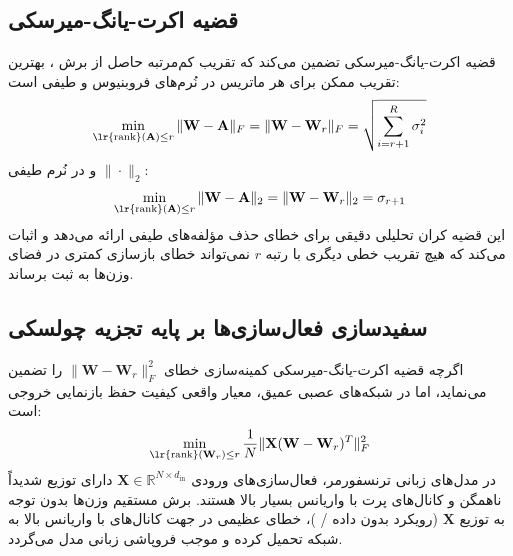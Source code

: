 \documentclass[12pt,a4paper]{report}
\theoremstyle{definition}
\begin{document}
\subsection{قضیه اکرت-یانگ-میرسکی }
قضیه اکرت-یانگ-میرسکی تضمین می‌کند که تقریب کم‌مرتبه حاصل از برش ، بهترین تقریب ممکن برای هر ماتریس در نُرم‌های فروبنیوس و طیفی است:
\begin{equation}
\min_{\text{\lr{rank}}(\mathbf{A}) \le r} \|\mathbf{W} - \mathbf{A}\|_F = \|\mathbf{W} - \mathbf{W}_r\|_F = \sqrt{\sum_{i=r+1}^R \sigma_i^2}
\end{equation}
و در نُرم طیفی $\|\cdot\|_2$:
\begin{equation}
\min_{\text{\lr{rank}}(\mathbf{A}) \le r} \|\mathbf{W} - \mathbf{A}\|_2 = \|\mathbf{W} - \mathbf{W}_r\|_2 = \sigma_{r+1}
\end{equation}
این قضیه کران تحلیلی دقیقی برای خطای حذف مؤلفه‌های طیفی ارائه می‌دهد و اثبات می‌کند که هیچ تقریب خطی دیگری با رتبه $r$ نمی‌تواند خطای بازسازی کمتری در فضای وزن‌ها به ثبت برساند.

\subsection{سفیدسازی فعال‌سازی‌ها بر پایه تجزیه چولسکی }
\label{sec:cholesky_whitening}
اگرچه قضیه اکرت-یانگ-میرسکی کمینه‌سازی خطای $\| \mathbf{W} - \mathbf{W}_r \|_F^2$ را تضمین می‌نماید، اما در شبکه‌های عصبی عمیق، معیار واقعی کیفیت حفظ بازنمایی خروجی است:
\begin{equation}
\min_{\text{\lr{rank}}(\mathbf{W}_r) \le r} \frac{1}{N} \| \mathbf{X}(\mathbf{W} - \mathbf{W}_r)^T \|_F^2
\end{equation}
در مدل‌های زبانی ترنسفورمر، فعال‌سازی‌های ورودی $\mathbf{X} \in \mathbb{R}^{N \times d_{\text{in}}}$ دارای توزیع شدیداً ناهمگن و کانال‌های پرت با واریانس بسیار بالا  هستند. برش مستقیم  وزن‌ها بدون توجه به توزیع $\mathbf{X}$ (رویکرد بدون داده / )، خطای عظیمی در جهت کانال‌های با واریانس بالا به شبکه تحمیل کرده و موجب فروپاشی زبانی مدل می‌گردد.
\end{document}
